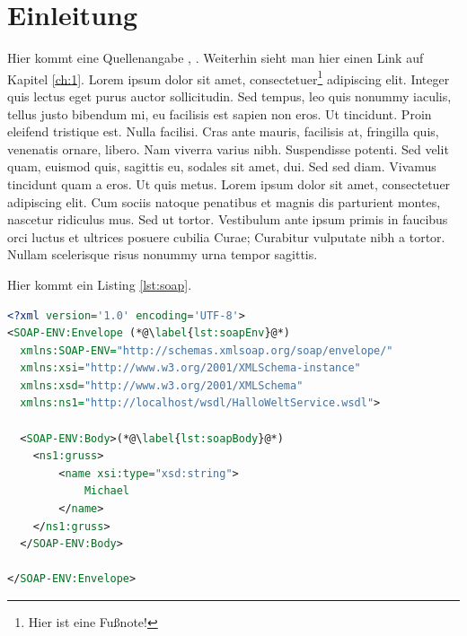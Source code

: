 \chapter{Einleitung}

Hier kommt eine Quellenangabe \cite{Gray1981}, \cite{Cerami2002}. Weiterhin sieht man hier einen Link auf Kapitel \ref{ch:1}.
Lorem ipsum dolor sit amet, consectetuer\footnote{Hier ist eine Fußnote!} adipiscing elit. Integer quis lectus eget purus auctor sollicitudin.
Sed tempus, leo quis nonummy iaculis, tellus justo bibendum mi, eu facilisis est sapien non eros. Ut tincidunt. Proin eleifend tristique est.
Nulla facilisi. Cras ante mauris, facilisis at, fringilla quis, venenatis ornare, libero. Nam viverra varius nibh. Suspendisse potenti.
Sed velit quam, euismod quis, sagittis eu, sodales sit amet, dui. Sed sed diam. Vivamus tincidunt quam a eros. Ut quis metus.
Lorem ipsum dolor sit amet, consectetuer adipiscing elit. Cum sociis natoque penatibus et magnis dis parturient montes, nascetur ridiculus mus.
Sed ut tortor. Vestibulum ante ipsum primis in faucibus orci luctus et ultrices posuere cubilia Curae; Curabitur vulputate nibh a tortor.
Nullam scelerisque risus nonummy urna tempor sagittis.

\noindent Hier kommt ein Listing \ref{lst:soap}.

\begin{center}
\begin{lstlisting}[caption={SOAP Anfrage an einen HalloWelt-Web-Service},label=lst:soap,language=XML,label={lst:soap}]
<?xml version='1.0' encoding='UTF-8'>
<SOAP-ENV:Envelope (*@\label{lst:soapEnv}@*)
  xmlns:SOAP-ENV="http://schemas.xmlsoap.org/soap/envelope/"
  xmlns:xsi="http://www.w3.org/2001/XMLSchema-instance"
  xmlns:xsd="http://www.w3.org/2001/XMLSchema"
  xmlns:ns1="http://localhost/wsdl/HalloWeltService.wsdl">

  <SOAP-ENV:Body>(*@\label{lst:soapBody}@*)
  	<ns1:gruss>
  		<name xsi:type="xsd:string">
  			Michael
  		</name>
  	</ns1:gruss>
  </SOAP-ENV:Body>

</SOAP-ENV:Envelope>
\end{lstlisting}
\end{center}

